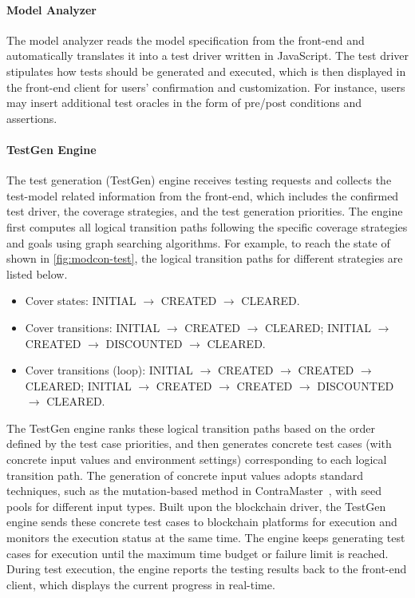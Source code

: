 \paragraph{Model Analyzer}
The model analyzer reads the model specification from the front-end and automatically translates it
into a test driver written in JavaScript.
The test driver stipulates how tests should be generated and executed, which is then displayed in
the front-end client for users' confirmation and customization.
For instance, users may insert additional test oracles in the form of pre/post conditions and
assertions.

\paragraph{TestGen Engine}
The test generation (TestGen) engine receives testing requests and collects the test-model related
information from the front-end, which includes the confirmed test driver, the coverage strategies,
and the test generation priorities.
The engine first computes all logical transition paths following the specific coverage strategies
and goals using graph searching algorithms.
For example, to reach the  state of \wecredit shown in \cref{fig:modcon-test}, the
logical transition paths for different strategies are listed below.

{\small\begin{itemize}[leftmargin=*,topsep=2pt]
		\item Cover states: INITIAL $\rightarrow$ CREATED $\rightarrow$ CLEARED.
		\item Cover transitions: INITIAL $\rightarrow$ CREATED $\rightarrow$ CLEARED; INITIAL $\rightarrow$
		CREATED $\rightarrow$ DISCOUNTED $\rightarrow$ CLEARED.
		\item Cover transitions (loop): INITIAL $\rightarrow$ CREATED $\rightarrow$ CREATED $\rightarrow$
		CLEARED;
		INITIAL $\rightarrow$ CREATED $\rightarrow$ CREATED $\rightarrow$ DISCOUNTED $\rightarrow$ CLEARED.
\end{itemize}}

The TestGen engine ranks these logical transition paths based on the order defined by the test
case priorities, and then generates concrete test cases (with concrete input values and environment
settings) corresponding to each logical transition path.
The generation of concrete input values adopts standard
techniques, such as the mutation-based method in ContraMaster~\cite{wang2019vultron,wang2019oracle},
with seed pools for different input types.
Built upon the blockchain driver, the TestGen engine sends these concrete test cases to blockchain
platforms for execution and monitors the execution status at the same time.
The engine keeps generating test cases for execution until the maximum time budget or failure
limit is reached.
During test execution, the engine reports the testing results back to the front-end client, which
displays the current progress in real-time.

